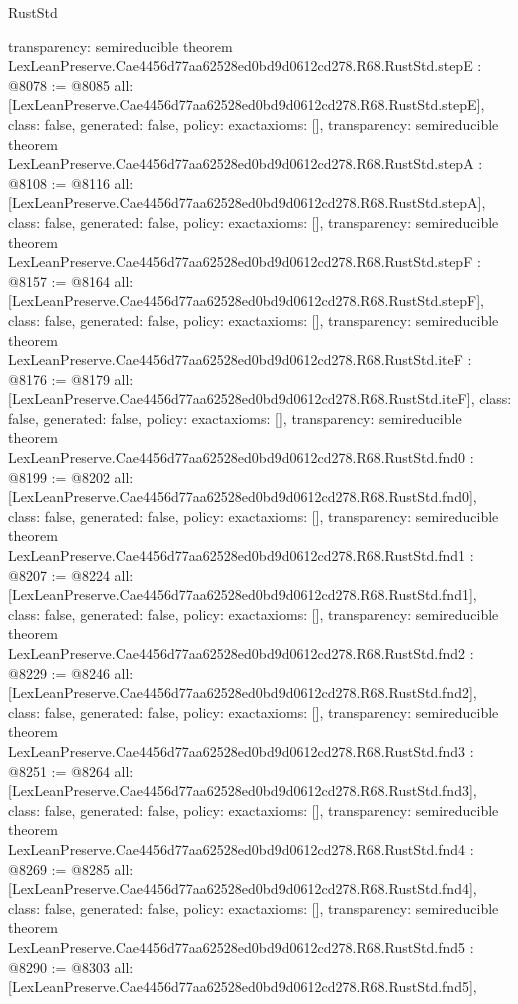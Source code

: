\begin{lexlean}{RustStd}
\begin{coremodule}
{  transparency: semireducible
}
theorem LexLeanPreserve.Cae4456d77aa62528ed0bd9d0612cd278.R68.RustStd.stepE : @8078 := @8085 {
  all: [LexLeanPreserve.Cae4456d77aa62528ed0bd9d0612cd278.R68.RustStd.stepE],
  class: false,
  generated: false,
  policy: exact{axioms: []},
  transparency: semireducible
}
theorem LexLeanPreserve.Cae4456d77aa62528ed0bd9d0612cd278.R68.RustStd.stepA : @8108 := @8116 {
  all: [LexLeanPreserve.Cae4456d77aa62528ed0bd9d0612cd278.R68.RustStd.stepA],
  class: false,
  generated: false,
  policy: exact{axioms: []},
  transparency: semireducible
}
theorem LexLeanPreserve.Cae4456d77aa62528ed0bd9d0612cd278.R68.RustStd.stepF : @8157 := @8164 {
  all: [LexLeanPreserve.Cae4456d77aa62528ed0bd9d0612cd278.R68.RustStd.stepF],
  class: false,
  generated: false,
  policy: exact{axioms: []},
  transparency: semireducible
}
theorem LexLeanPreserve.Cae4456d77aa62528ed0bd9d0612cd278.R68.RustStd.iteF : @8176 := @8179 {
  all: [LexLeanPreserve.Cae4456d77aa62528ed0bd9d0612cd278.R68.RustStd.iteF],
  class: false,
  generated: false,
  policy: exact{axioms: []},
  transparency: semireducible
}
theorem LexLeanPreserve.Cae4456d77aa62528ed0bd9d0612cd278.R68.RustStd.fnd0 : @8199 := @8202 {
  all: [LexLeanPreserve.Cae4456d77aa62528ed0bd9d0612cd278.R68.RustStd.fnd0],
  class: false,
  generated: false,
  policy: exact{axioms: []},
  transparency: semireducible
}
theorem LexLeanPreserve.Cae4456d77aa62528ed0bd9d0612cd278.R68.RustStd.fnd1 : @8207 := @8224 {
  all: [LexLeanPreserve.Cae4456d77aa62528ed0bd9d0612cd278.R68.RustStd.fnd1],
  class: false,
  generated: false,
  policy: exact{axioms: []},
  transparency: semireducible
}
theorem LexLeanPreserve.Cae4456d77aa62528ed0bd9d0612cd278.R68.RustStd.fnd2 : @8229 := @8246 {
  all: [LexLeanPreserve.Cae4456d77aa62528ed0bd9d0612cd278.R68.RustStd.fnd2],
  class: false,
  generated: false,
  policy: exact{axioms: []},
  transparency: semireducible
}
theorem LexLeanPreserve.Cae4456d77aa62528ed0bd9d0612cd278.R68.RustStd.fnd3 : @8251 := @8264 {
  all: [LexLeanPreserve.Cae4456d77aa62528ed0bd9d0612cd278.R68.RustStd.fnd3],
  class: false,
  generated: false,
  policy: exact{axioms: []},
  transparency: semireducible
}
theorem LexLeanPreserve.Cae4456d77aa62528ed0bd9d0612cd278.R68.RustStd.fnd4 : @8269 := @8285 {
  all: [LexLeanPreserve.Cae4456d77aa62528ed0bd9d0612cd278.R68.RustStd.fnd4],
  class: false,
  generated: false,
  policy: exact{axioms: []},
  transparency: semireducible
}
theorem LexLeanPreserve.Cae4456d77aa62528ed0bd9d0612cd278.R68.RustStd.fnd5 : @8290 := @8303 {
  all: [LexLeanPreserve.Cae4456d77aa62528ed0bd9d0612cd278.R68.RustStd.fnd5],
}
\end{coremodule}
\end{lexlean}
